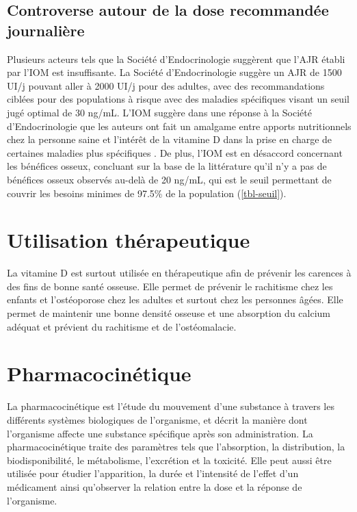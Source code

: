 \documentclass[
  a4paper,
  DIV=11,
  numbers=noendperiod,
  listof=totoc]{scrreprt}
\begin{document}
\hypertarget{controverse-autour-de-la-dose-recommanduxe9e-journaliuxe8re}{%
\subsection{Controverse autour de la dose recommandée
journalière}\label{controverse-autour-de-la-dose-recommanduxe9e-journaliuxe8re}}

Plusieurs acteurs tels que la Société d'Endocrinologie suggèrent que
l'\ac{AJR} établi par l'\ac{IOM} est insuffisante. La Société
d'Endocrinologie suggère un \ac{AJR} de 1500 UI/j pouvant aller à 2000
UI/j pour des adultes, avec des recommandations ciblées pour des
populations à risque avec des maladies spécifiques visant un seuil jugé
optimal de 30 ng/mL. L'\ac{IOM} suggère dans une réponse à la Société
d'Endocrinologie que les auteurs ont fait un amalgame entre apports
nutritionnels chez la personne saine et l'intérêt de la vitamine D dans
la prise en charge de certaines maladies plus spécifiques
\autocite{Rosen.2012}. De plus, l'\ac{IOM} est en désaccord concernant
les bénéfices osseux, concluant sur la base de la littérature qu'il n'y
a pas de bénéfices osseux observés au-delà de 20 ng/mL, qui est le seuil
permettant de couvrir les besoins minimes de 97.5\% de la population
(\cref{tbl-seuil}).

\hypertarget{utilisation-thuxe9rapeutique}{%
\section{Utilisation thérapeutique}\label{utilisation-thuxe9rapeutique}}

La vitamine D est surtout utilisée en thérapeutique afin de prévenir les
carences à des fins de bonne santé osseuse. Elle permet de prévenir le
rachitisme chez les enfants et l'ostéoporose chez les adultes et surtout
chez les personnes âgées. Elle permet de maintenir une bonne densité
osseuse et une absorption du calcium adéquat et prévient du rachitisme
et de l'ostéomalacie.

\hypertarget{pharmacocinuxe9tique}{%
\section{Pharmacocinétique}\label{pharmacocinuxe9tique}}

La pharmacocinétique est l'étude du mouvement d'une substance à travers
les différents systèmes biologiques de l'organisme, et décrit la manière
dont l'organisme affecte une substance spécifique après son
administration. La pharmacocinétique traite des paramètres tels que
l'absorption, la distribution, la biodisponibilité, le métabolisme,
l'excrétion et la toxicité. Elle peut aussi être utilisée pour étudier
l'apparition, la durée et l'intensité de l'effet d'un médicament ainsi
qu'observer la relation entre la dose et la réponse de l'organisme.
\end{document}
